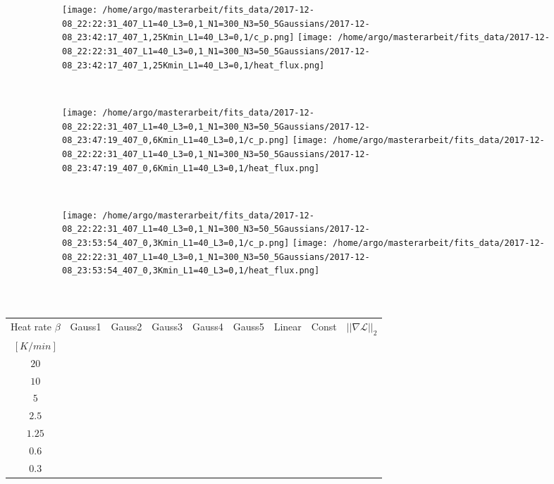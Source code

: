 \documentclass{scrartcl}[12pt, halfparskip]
\numberwithin{equation}{section}
\numberwithin{figure}{section}
\numberwithin{table}{section}
\begin{document}
\begin{figure}[H]
	\begin{subfigure}{1.\textwidth}
		\texttt{[image: /home/argo/masterarbeit/fits\_data/2017-12-08\_22:22:31\_407\_L1=40\_L3=0,1\_N1=300\_N3=50\_5Gaussians/2017-12-08\_23:42:17\_407\_1,25Kmin\_L1=40\_L3=0,1/c\_p.png]}
		\texttt{[image: /home/argo/masterarbeit/fits\_data/2017-12-08\_22:22:31\_407\_L1=40\_L3=0,1\_N1=300\_N3=50\_5Gaussians/2017-12-08\_23:42:17\_407\_1,25Kmin\_L1=40\_L3=0,1/heat\_flux.png]}
	\end{subfigure} \\[1ex]
	
	\begin{subfigure}{1.\textwidth}
		\texttt{[image: /home/argo/masterarbeit/fits\_data/2017-12-08\_22:22:31\_407\_L1=40\_L3=0,1\_N1=300\_N3=50\_5Gaussians/2017-12-08\_23:47:19\_407\_0,6Kmin\_L1=40\_L3=0,1/c\_p.png]}
		\texttt{[image: /home/argo/masterarbeit/fits\_data/2017-12-08\_22:22:31\_407\_L1=40\_L3=0,1\_N1=300\_N3=50\_5Gaussians/2017-12-08\_23:47:19\_407\_0,6Kmin\_L1=40\_L3=0,1/heat\_flux.png]}
	\end{subfigure} \\[1ex]
	
	\begin{subfigure}{1.\textwidth}
		\texttt{[image: /home/argo/masterarbeit/fits\_data/2017-12-08\_22:22:31\_407\_L1=40\_L3=0,1\_N1=300\_N3=50\_5Gaussians/2017-12-08\_23:53:54\_407\_0,3Kmin\_L1=40\_L3=0,1/c\_p.png]}
		\texttt{[image: /home/argo/masterarbeit/fits\_data/2017-12-08\_22:22:31\_407\_L1=40\_L3=0,1\_N1=300\_N3=50\_5Gaussians/2017-12-08\_23:53:54\_407\_0,3Kmin\_L1=40\_L3=0,1/heat\_flux.png]}
	\end{subfigure} \\[1ex]
	\caption{}
	\label{fig:optim_c_p_heat_flux_5Gaussians_2}
\end{figure}




\begin{table}[H]
	\centering
	\begin{tabular}{| c | c | c | c | c | c | c | c | c |} \hline
		Heat rate $\beta$ & Gauss1 & Gauss2 & Gauss3 & Gauss4 & Gauss5 & Linear & Const & $||\nabla \mathcal{L}||_2$ \\ 
		$[K/min]$ & & & & & & & & \\ \hline
		$20$ & & & & & & & & \\
		$10$ & & & & & & & & \\
		$5$ & & & & & & & & \\
		$2.5$ & & & & & & & & \\
		$1.25$ & & & & & & & & \\
		$0.6$ & & & & & & & & \\
		$0.3$ & & & & & & & & \\ \hline
	\end{tabular}
	\caption{}
	\label{tab:parameter_table_5Gaussians}
\end{table}
\end{document}
